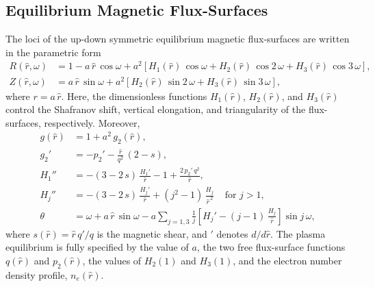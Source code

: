 \documentclass[12pt,prb,aps]{revtex4-1}
\begin{document}
\subsection{Equilibrium Magnetic Flux-Surfaces}
The loci of the up-down symmetric equilibrium magnetic flux-surfaces are written in the parametric form\,\cite{tear5}
\begin{align}
R(\hat{r},\omega) &= 1 -a\,\hat{r}\,\cos\omega + a^{2}\left[H_1(\hat{r})\,\cos \omega + H_2(\hat{r})\,\cos 2\,\omega+H_3(\hat{r})\,\cos 3\,\omega\right], \label{e19x}\\[0.5ex]
Z(\hat{r},\omega)&= a\,\hat{r}\,\sin\omega +a^{2}\left[H_2(\hat{r})\,\sin 2\,\omega+H_3(\hat{r})\,\sin 3\,\omega\right], \label{e20x}
\end{align}
where  $r=a\,\hat{r}$. 
Here, the dimensionless functions $H_1(\hat{r})$, $H_2(\hat{r})$, and $H_3(\hat{r})$ control the Shafranov shift, vertical elongation, and  triangularity of
the flux-surfaces, respectively. 
Moreover,\cite{exp}
\begin{align}
g(\hat{r}) &= 1+ a^2\,g_2(\hat{r}),\\[0.5ex]
g_2'&= -p_2' - \frac{\hat{r}}{q^2}\,(2-s),\\[0.5ex]
H_1''&= -(3-2\,s)\,\frac{H_1' }{\hat{r}}-1+\frac{2\,p_2'\,q^2}{\hat{r}},\label{e27}\\[0.5ex]
H_j''&= -(3-2\,s)\,\frac{H_j'}{\hat{r}}+(j^2-1)\,\frac{H_j}{\hat{r}^{\,2}}~~~~~\mbox{for $j>1$},\label{e33x}\\[0.5ex]
\theta &= \omega+a\,\hat{r}\,\sin\omega - a\sum_{j=1,3}\frac{1}{j}\left[H_j'-(j-1)\,\frac{H_j}{\hat{r}}\right]\sin j\,\omega,
\end{align}
where $s(\hat{r}) = \hat{r}\,q'/q$ is the magnetic shear, and $'$ denotes $d/d\hat{r}$. The plasma equilibrium is fully specified by the value of $a$, the two free
flux-surface functions $q(\hat{r})$ and $p_2(\hat{r})$, the values of $H_2(1)$ and $H_3(1)$, and the electron number density profile, $n_e(\hat{r})$. 
\end{document}

